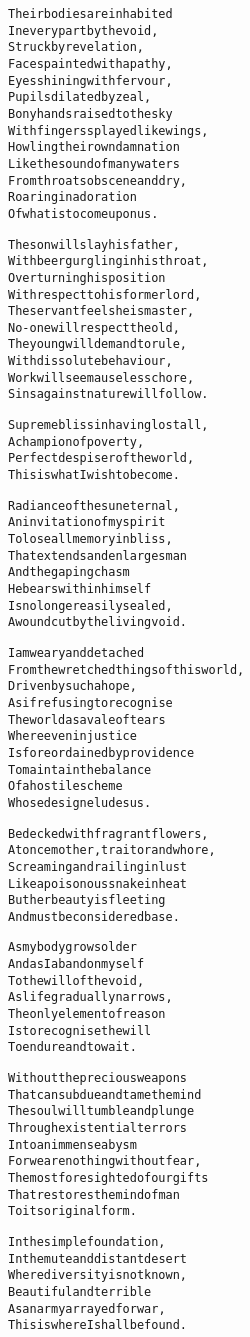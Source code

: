 \documentclass{article}
\begin{document}
\begin{alltt}
Their bodies are inhabited
In every part by the void,
Struck by revelation,
Faces painted with apathy,
Eyes shining with fervour,
Pupils dilated by zeal,
Bony hands raised to the sky
With fingers splayed like wings,
Howling their own damnation
Like the sound of many waters
From throats obscene and dry,
Roaring in adoration
Of what is to come upon us.

The son will slay his father,
With beer gurgling in his throat,
Overturning his position
With respect to his former lord,
The servant feels he is master,
No-one will respect the old,
The young will demand to rule,
With dissolute behaviour,
Work will seem a useless chore,
Sins against nature will follow.

Supreme bliss in having lost all,
A champion of poverty,
Perfect despiser of the world,
This is what I wish to become.

Radiance of the sun eternal,
An invitation of my spirit
To lose all memory in bliss,
That extends and enlarges man
And the gaping chasm
He bears within himself
Is no longer easily sealed,
A wound cut by the living void.

I am weary and detached
From the wretched things of this world,
Driven by such a hope,
As if refusing to recognise
The world as a vale of tears
Where even injustice
Is foreordained by providence
To maintain the balance
Of a hostile scheme
Whose design eludes us.

Bedecked with fragrant flowers,
At once mother, traitor and whore,
Screaming and railing in lust
Like a poisonous snake in heat
But her beauty is fleeting
And must be considered base.

As my body grows older
And as I abandon myself
To the will of the void,
As life gradually narrows,
The only element of reason
Is to recognise the will
To endure and to wait.

Without the precious weapons
That can subdue and tame the mind
The soul will tumble and plunge
Through existential terrors
Into an immense abysm
For we are nothing without fear,
The most foresighted of our gifts
That restores the mind of man
To its original form.

In the simple foundation,
In the mute and distant desert
Where diversity is not known,
Beautiful and terrible
As an army arrayed for war,
This is where I shall be found.
\end{alltt}

\iffalse
Holding up one finger as if in admonition
Immersed in gloom
The void can be named only through the most distorted things
Nothing exists that so fills and binds the heart as love does
On this side the choir of angels, on that the gaping maw of hell
What first triumphed in its folly and took delight in its jesting now is here punished and rewarded, liberated from the seduction of the passions, rigidified by eternity, consigned to the eternal frost that is to preserve and purify it, saved from corruption through the triumph of corruption
The people are transformed into an assembly belched forth from the abysms of the unknown earth
\fi
\end{document}
